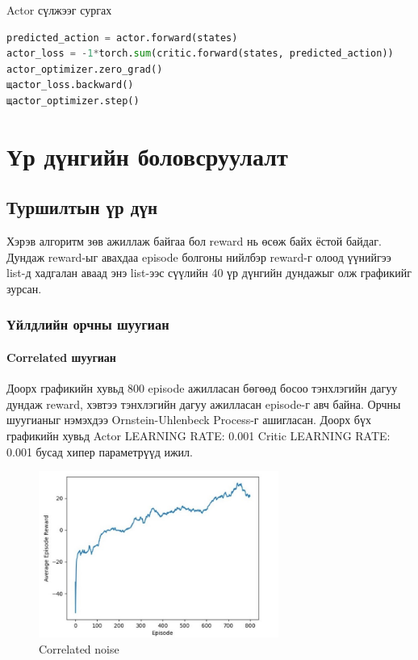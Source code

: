 \documentclass[12pt,A4]{report}
\begin{document}
Actor сүлжээг сургах

\begin{lstlisting}[language=Python, caption=Actor сүлжээг сургах, frame=single]
predicted_action = actor.forward(states)
actor_loss = -1*torch.sum(critic.forward(states, predicted_action))
actor_optimizer.zero_grad()
щactor_loss.backward()
щactor_optimizer.step()
\end{lstlisting}

\chapter{Үр дүнгийн боловсруулалт}

\section{Туршилтын үр дүн}

Хэрэв алгоритм зөв ажиллаж байгаа бол reward нь өсөж байх ёстой байдаг. Дундаж reward-ыг авахдаа episode болгоны нийлбэр reward-г олоод үүнийгээ list-д хадгалан аваад энэ list-ээс сүүлийн 40 үр дүнгийн дундажыг олж графикийг зурсан.

\subsection{Үйлдлийн орчны шуугиан}

\subsubsection{Correlated шуугиан}

Доорх графикийн хувьд 800 episode ажилласан бөгөөд босоо тэнхлэгийн дагуу дундаж reward, хэвтээ тэнхлэгийн дагуу ажилласан episode-г авч байна. Орчны шуугианыг нэмэхдээ Ornstein-Uhlenbeck Process-г ашигласан. Доорх бүх графикийн хувьд Actor LEARNING RATE: 0.001 Critic LEARNING RATE: 0.001 бусад хипер параметрүүд ижил.

\begin{figure}[H]
\centering
\includegraphics[width=0.7\textwidth]{./images/after_800_ep}
\caption{Correlated noise}
\end{figure}
\end{document}

